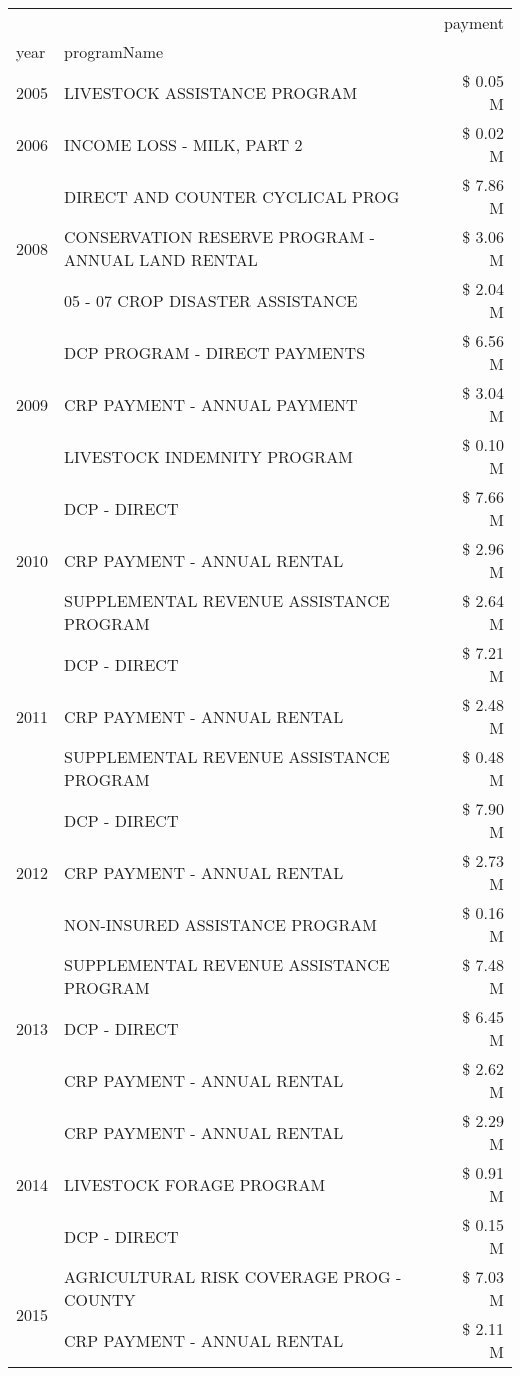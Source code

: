 \begin{tabular}{llr}
\toprule
 &  & payment \\
year & programName &  \\
\midrule
2005 & LIVESTOCK ASSISTANCE PROGRAM & \$ 0.05 M \\
\cline{1-3}
2006 & INCOME LOSS - MILK, PART 2 & \$ 0.02 M \\
\cline{1-3}
\multirow[t]{3}{*}{2008} & DIRECT AND COUNTER CYCLICAL PROG & \$ 7.86 M \\
 & CONSERVATION RESERVE PROGRAM - ANNUAL LAND RENTAL & \$ 3.06 M \\
 & 05 - 07 CROP DISASTER ASSISTANCE & \$ 2.04 M \\
\cline{1-3}
\multirow[t]{3}{*}{2009} & DCP PROGRAM - DIRECT PAYMENTS & \$ 6.56 M \\
 & CRP PAYMENT - ANNUAL PAYMENT & \$ 3.04 M \\
 & LIVESTOCK INDEMNITY PROGRAM & \$ 0.10 M \\
\cline{1-3}
\multirow[t]{3}{*}{2010} & DCP - DIRECT & \$ 7.66 M \\
 & CRP PAYMENT - ANNUAL RENTAL & \$ 2.96 M \\
 & SUPPLEMENTAL REVENUE ASSISTANCE PROGRAM & \$ 2.64 M \\
\cline{1-3}
\multirow[t]{3}{*}{2011} & DCP - DIRECT & \$ 7.21 M \\
 & CRP PAYMENT - ANNUAL RENTAL & \$ 2.48 M \\
 & SUPPLEMENTAL REVENUE ASSISTANCE PROGRAM & \$ 0.48 M \\
\cline{1-3}
\multirow[t]{3}{*}{2012} & DCP - DIRECT & \$ 7.90 M \\
 & CRP PAYMENT - ANNUAL RENTAL & \$ 2.73 M \\
 & NON-INSURED ASSISTANCE PROGRAM & \$ 0.16 M \\
\cline{1-3}
\multirow[t]{3}{*}{2013} & SUPPLEMENTAL REVENUE ASSISTANCE PROGRAM & \$ 7.48 M \\
 & DCP - DIRECT & \$ 6.45 M \\
 & CRP PAYMENT - ANNUAL RENTAL & \$ 2.62 M \\
\cline{1-3}
\multirow[t]{3}{*}{2014} & CRP PAYMENT - ANNUAL RENTAL & \$ 2.29 M \\
 & LIVESTOCK FORAGE PROGRAM & \$ 0.91 M \\
 & DCP - DIRECT & \$ 0.15 M \\
\cline{1-3}
\multirow[t]{3}{*}{2015} & AGRICULTURAL RISK COVERAGE PROG - COUNTY & \$ 7.03 M \\
 & CRP PAYMENT - ANNUAL RENTAL & \$ 2.11 M \\

\end{tabular}
